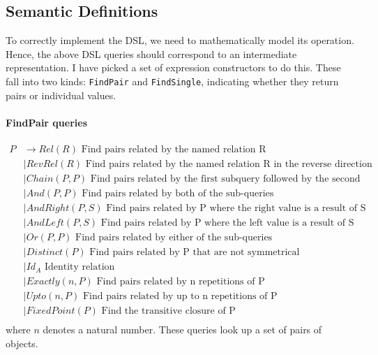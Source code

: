 \documentclass[12pt,a4paper,twoside,openright]{report}
\newcommand\codeName[1]{\texttt{#1}}
\let\oldparagraph\paragraph
\renewcommand{\paragraph}[1]{\oldparagraph{#1}\mbox{}}
\begin{document}
\subsection{Semantic Definitions}\label{ADTDef}
To correctly implement the DSL, we need to mathematically model its operation. Hence, the above DSL queries should correspond to an intermediate representation. I have picked a set of expression constructors to do this. These fall into two kinds: \codeName{FindPair} and \codeName{FindSingle}, indicating whether they return pairs or individual values.

\paragraph{FindPair queries}
\begin{equation}
\label{PDefinition}
\begin{split}
P  &\rightarrow Rel(R) \mbox{ Find pairs related by the named relation R}\\
&\mid RevRel(R) \mbox{ Find pairs related by the named relation R in the reverse direction}\\
&\mid Chain(P, P) \mbox{   Find pairs related by the first subquery followed by the second}\\
&\mid And(P, P) \mbox{  Find pairs related by both of the sub-queries}\\
&\mid AndRight(P, S) \mbox{  Find pairs related by P where the right value is a result of S}\\
&\mid AndLeft(P, S) \mbox{  Find pairs related by P where the left value is a result of S}\\
&\mid Or(P, P) \mbox{  Find pairs related by either of the sub-queries}\\
&\mid Distinct(P) \mbox{  Find pairs related by P that are not symmetrical}\\
&\mid Id_A \mbox{ Identity relation}\\
&\mid Exactly(\mathit{n}, P) \mbox{  Find pairs related by n repetitions of P}\\
&\mid Upto(\mathit{n}, P) \mbox{  Find pairs related by up to n repetitions of P}\\
&\mid FixedPoint(P) \mbox{  Find the transitive closure of P}\\
\end{split}
\end{equation} 
where $n$ denotes a natural number. These queries look up a set of pairs of objects.\\
\end{document}
